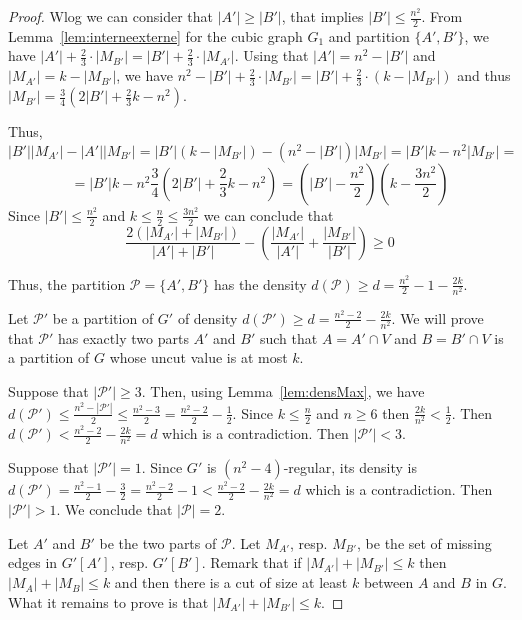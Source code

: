 \documentclass[a4paper,USenglish,cleveref, autoref]{lipics-v2021}
\begin{document}
\begin{proof}
Wlog we can consider that $|A'|\geq |B'|$, that implies $|B'|\leq \frac{n^2}{2}$.
From Lemma~\ref{lem:interneexterne}  for the cubic graph $G_1$ and partition $\{A', B'\}$,  we have 
$|A'|+ \frac{2}{3}\cdot |M_{B'}| = |B'| + \frac{2}{3} \cdot |M_{A'}|$. Using that $|A'|=n^2-|B'|$ and $|M_{A'}|=k-|M_{B'}|$, we have $n^2-|B'|+ \frac{2}{3}\cdot |M_{B'}| = |B'| + \frac{2}{3} \cdot (k-|M_{B'}|)$  and thus $ |M_{B'}|= \frac{3}{4} (2 |B'|+ \frac{2}{3} k-n^2)$.

Thus, 
$$|B'||M_{A'}|-|A'||M_{B'}|= |B'| (k-|M_{B'}|) - (n^2-|B'|)|M_{B'}|=|B'|k-n^2 |M_{B'}|=$$
$$=|B'|k-n^2\frac{3}{4} \left(2 |B'|+ \frac{2}{3} k-n^2\right)=\left(|B'|-\frac{n^2}{2}\right)\left(k-\frac{3n^2}{2}\right)$$
Since $|B'|\leq \frac{n^2}{2}$ and $k \leq  \frac{n}{2}\leq \frac{3n^2}{2}$ we can conclude  that 
$$  \frac{2(|M_{A'}|+|M_{B'}|)}{|A'|+|B'|} - \left(\frac{|M_{A'}|}{|A'|} + \frac{|M_{B'}|}{|B'|}\right) \geq 0$$

Thus, the partition $\mathcal{P}=\{A',B'\}$  has the density $d(\mathcal{P})
\geq d=\frac{n^2}{2} - 1 - \frac{2k}{n^2}$.
 


 \bigskip
 Let $\mathcal{P'}$ be a partition of $G'$ of density $d(\mathcal{P'}) \geq d = \frac{n^2-2}{2} - \frac{2k}{n^2}$. We will prove that $\mathcal{P'}$ has exactly two parts $A'$ and $B'$ such that $A = A' \cap V$ and $B = B' \cap V$ is a partition of $G$ whose uncut value is at most $k$.

Suppose that $|\mathcal{P'}| \geq 3$. Then, using Lemma~\ref{lem:densMax}, we have $d(\mathcal{P'}) \leq \frac{n^2 - |\mathcal{P'}|}{2} \leq \frac{n^2-3}{2} = \frac{n^2-2}{2} - \frac{1}{2}$. Since $k \leq \frac{n}{2}$ and $n \geq 6$ then $\frac{2k}{n^2} < \frac{1}{2}$. Then $d(\mathcal{P'}) < \frac{n^{2}-2}{2} - \frac{2k}{n^2} = d$ which is a contradiction. Then $|\mathcal{P'}| < 3$.

Suppose that $|\mathcal{P'}| = 1$. Since $G'$ is $(n^2-4)$-regular, its density is $d(\mathcal{P'}) = \frac{n^2-1}{2} - \frac{3}{2} = \frac{n^2-2}{2} - 1 < \frac{n^2-2}{2} - \frac{2k}{n^2} = d$ which is a contradiction. Then $|\mathcal{P'}| > 1$. We conclude that $|\mathcal{P}| = 2$.

Let $A'$ and $B'$ be the two parts of $\mathcal{P}$. Let ${M}_{A'}$, resp. ${M}_{B'}$, be the set of missing edges in $G'[A']$, resp. $G'[B']$. Remark that if $|M_{A'}| + |M_{B'}| \leq k$ then $|M_{A}| + |M_{B}| \leq k$ and then there is a cut of size at least $k$ between $A$ and $B$ in $G$. What it remains to prove is that $|M_{A'}| + |M_{B'}| \leq k$.




\end{proof}
\end{document}
